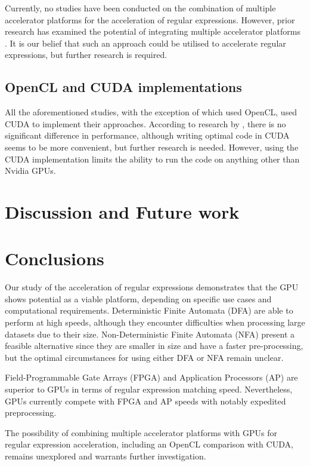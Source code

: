 \documentclass[10pt,onecolumn,twoside,english,a4paper]{article}
\begin{document}
Currently, no studies have been conducted on the combination of multiple accelerator platforms for the acceleration of regular expressions. However, prior research has examined the potential of integrating multiple accelerator platforms \cite{kobayashi2019gpu}. It is our belief that such an approach could be utilised to accelerate regular expressions, but further research is required.

\subsection{OpenCL and CUDA implementations} \label{OpenCL and CUDA implementations:Results}
All the aforementioned studies, with the exception of \cite{rosciszewski2014regular} which used OpenCL, used CUDA to implement their approaches. According to research by \cite{Fang:Comparison-cuda-opencl}, there is no significant difference in performance, although writing optimal code in CUDA seems to be more convenient, but further research is needed.
However, using the CUDA implementation limits the ability to run the code on anything other than Nvidia GPUs.

\section{Discussion and Future work} \label{Discussion and Future work}

\section{Conclusions} \label{Conclusions}
Our study of the acceleration of regular expressions demonstrates that the GPU shows potential as a viable platform, depending on specific use cases and computational requirements. Deterministic Finite Automata (DFA) are able to perform at high speeds, although they encounter difficulties when processing large datasets due to their size. Non-Deterministic Finite Automata (NFA) present a feasible alternative since they are smaller in size and have a faster pre-processing, but the optimal circumstances for using either DFA or NFA remain unclear.

Field-Programmable Gate Arrays (FPGA) and Application Processors (AP) are superior to GPUs in terms of regular expression matching speed. Nevertheless, GPUs currently compete with FPGA and AP speeds with notably expedited preprocessing.

The possibility of combining multiple accelerator platforms with GPUs for regular expression acceleration, including an OpenCL comparison with CUDA, remains unexplored and warrants further investigation.



\end{document}
